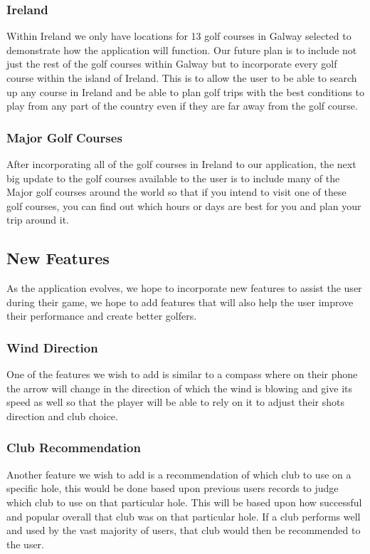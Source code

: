\subsubsection{Ireland}
Within Ireland we only have locations for 13 golf courses in Galway selected to demonstrate how the application will function. Our future plan is to include not just the rest of the golf courses within Galway but to incorporate every golf course within the island of Ireland. This is to allow the user to be able to search up any course in Ireland and be able to plan golf trips with the best conditions to play from any part of the country even if they are far away from the golf course.
\subsubsection{Major Golf Courses}
After incorporating all of the golf courses in Ireland to our application, the next big update to the golf courses available to the user is to include many of the Major golf courses around the world so that if you intend to visit one of these golf courses, you can find out which hours or days are best for you and plan your trip around it.
\subsection{New Features}
As the application evolves, we hope to incorporate new features to assist the user during their game, we hope to add features that will also help the user improve their performance and create better golfers.
\subsubsection{Wind Direction}
One of the features we wish to add is similar to a compass where on their phone the arrow will change in the direction of which the wind is blowing and give its speed as well so that the player will be able to rely on it to adjust their shots direction and club choice.
\subsubsection{Club Recommendation}
Another feature we wish to add is a recommendation of which club to use on a specific hole, this would be done based upon previous users records to judge which club to use on that particular hole. This will be based upon how successful and popular overall that club was on that particular hole. If a club performs well and used by the vast majority of users, that club would then be recommended to the user.
